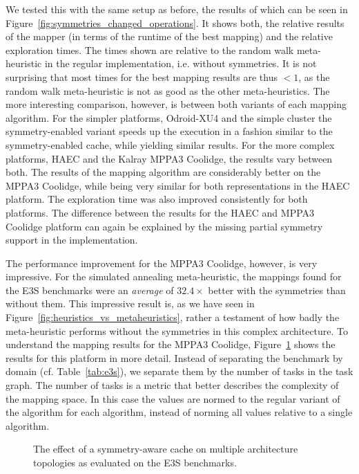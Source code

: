 We tested this with the same setup as before, the results of which can be seen in Figure~\ref{fig:symmetries_changed_operations}.
It shows both, the relative results of the mapper (in terms of the runtime of the best mapping) and the relative exploration times.
The times shown are relative to the random walk meta-heuristic in the regular implementation, i.e. without symmetries.
It is not surprising that most times for the best mapping results are thus $<1$, as the random walk meta-heuristic is not as good as the other meta-heuristics.
The more interesting comparison, however, is between both variants of each mapping algorithm.
For the simpler platforms, Odroid-XU4 and the simple cluster  the symmetry-enabled variant speeds up the execution in a fashion similar to the symmetry-enabled cache, while yielding similar results.
For the more complex platforms, \ac{HAEC} and the Kalray MPPA3 Coolidge, the results vary between both.
The results of the mapping algorithm are considerably better on the MPPA3 Coolidge, while being very similar for both representations in the \ac{HAEC} platform.
The exploration time was also improved consistently for both platforms.
The difference between the results for the \ac{HAEC} and MPPA3 Coolidge platform can again be explained by the missing partial symmetry support in the implementation.

The performance improvement for the MPPA3 Coolidge, however, is very impressive.
For the simulated annealing meta-heuristic, the mappings found for the \ac{E3S} benchmarks were an \emph{average} of $32.4 \times$ better with the symmetries than without them.
This impressive result is, as we have seen in Figure~\ref{fig:heuristics_vs_metaheuristics}, rather a testament of how badly the meta-heuristic performs without the symmetries in this complex architecture.
To understand the mapping results for the MPPA3 Coolidge, Figure~\ref{fig:symmetry_coolidge_changed_operations} shows the results for this platform in more detail.
Instead of separating the benchmark by domain (cf. Table~\ref{tab:e3s}), we separate them by the number of tasks in the task graph.
The number of tasks is a metric that better describes the complexity of the mapping space. 
In this case the values are normed to the regular variant of the algorithm for each algorithm, instead of norming all values relative to a single algorithm.

\begin{figure}[h]
	\centering
   \resizebox{0.95\textwidth}{!}{}
	\caption{The effect of a symmetry-aware cache on multiple architecture topologies as evaluated on the \ac{E3S} benchmarks.}
	\label{fig:symmetry_coolidge_changed_operations}
\end{figure}

